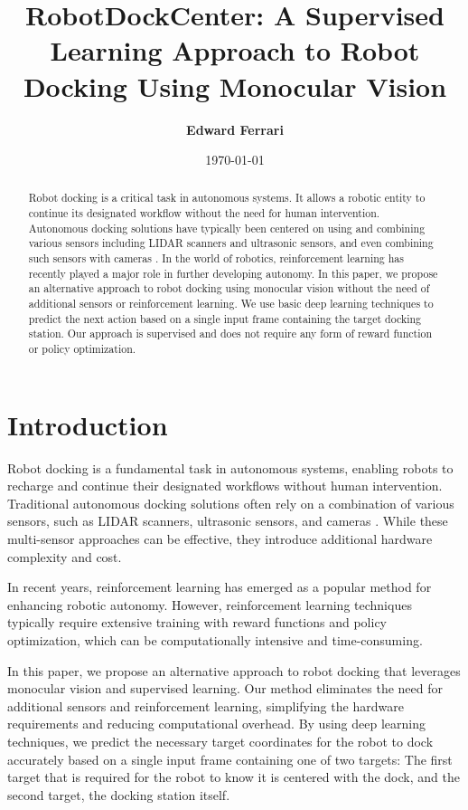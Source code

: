 \documentclass{article}
\begin{document}
\title{\textbf{RobotDockCenter: A Supervised Learning Approach to Robot Docking Using Monocular Vision}}
\author{\textbf{Edward Ferrari}}
\date{\today}

\maketitle

\begin{abstract}
Robot docking is a critical task in autonomous systems. 
It allows a robotic entity to continue its designated workflow without the need for human intervention. 
Autonomous docking solutions have typically been centered on using and combining various sensors including LIDAR scanners and ultrasonic sensors, and even combining such sensors with cameras \citep{app131910675}. 
In the world of robotics, reinforcement learning has recently played a major role in further developing autonomy. 
In this paper, we propose an alternative approach to robot docking using monocular vision without the need of additional sensors or reinforcement learning. 
We use basic deep learning techniques to predict the next action based on a single input frame containing the target docking station.
Our approach is supervised and does not require any form of reward function or policy optimization.
\end{abstract}

\section{Introduction}
Robot docking is a fundamental task in autonomous systems, enabling robots to recharge and continue their designated workflows without human intervention. Traditional autonomous docking solutions often rely on a combination of various sensors, such as LIDAR scanners, ultrasonic sensors, and cameras \citep{app131910675}. While these multi-sensor approaches can be effective, they introduce additional hardware complexity and cost.

In recent years, reinforcement learning has emerged as a popular method for enhancing robotic autonomy. However, reinforcement learning techniques typically require extensive training with reward functions and policy optimization, which can be computationally intensive and time-consuming.

In this paper, we propose an alternative approach to robot docking that leverages monocular vision and supervised learning. Our method eliminates the need for additional sensors and reinforcement learning, simplifying the hardware requirements and reducing computational overhead. By using deep learning techniques, we predict the necessary target coordinates for the robot to dock accurately based on a single input frame containing one of two targets: The first target that is required for the robot to know it is centered with the dock, and the second target, the docking station itself.
\end{document}
